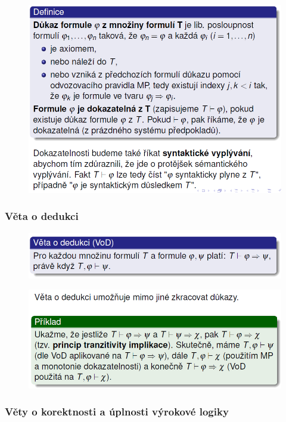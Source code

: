 \documentclass[10pt,a4paper]{article}
\theoremstyle{note}
\begin{document}
			\begin{figure}[H]
			\centering
			\includegraphics[width=12cm]{img/dukaz.png}
			\end{figure}

		\subsubsection{Věta o dedukci}

			\begin{figure}[H]
			\centering
			\includegraphics[width=13cm]{img/VoD.png}
			\end{figure}

			\begin{figure}[H]
			\centering
			\includegraphics[width=13cm]{img/VoDpriklad.png}
			\end{figure}

		\subsubsection{Věty o korektnosti a úplnosti výrokové logiky}
\end{document}
